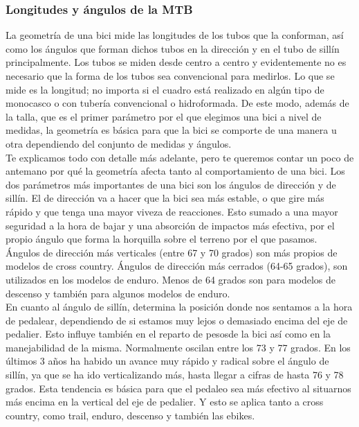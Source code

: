 \documentclass{article}
\begin{document}
\subsubsection{Longitudes y ángulos de la MTB}
La geometría de una bici mide las longitudes de los tubos que la conforman, así como los ángulos que forman dichos tubos en la dirección y en el tubo de sillín principalmente. Los tubos se miden desde centro a centro y evidentemente no es necesario que la forma de los tubos sea convencional para medirlos. Lo que se mide es la longitud; no importa si el cuadro está realizado en algún tipo de monocasco o con tubería convencional o hidroformada. De este modo, además de la talla, que es el primer parámetro por el que elegimos una bici a nivel de medidas, la geometría es básica para que la bici se comporte de una manera u otra dependiendo del conjunto de medidas y ángulos.\\
Te explicamos todo con detalle más adelante, pero te queremos contar un poco de antemano por qué la geometría afecta tanto al comportamiento de una bici. Los dos parámetros más importantes de una bici son los ángulos de dirección y de sillín. El de dirección va a hacer que la bici sea más estable, o que gire más rápido y que tenga una mayor viveza de reacciones. Esto sumado a una mayor seguridad a la hora de bajar y una absorción de impactos más efectiva, por el propio ángulo que forma la horquilla sobre el terreno por el que pasamos. Ángulos de dirección más verticales (entre 67 y 70 grados) son más propios de modelos de cross country. Ángulos de dirección más cerrados (64-65 grados), son utilizados en los modelos de enduro. Menos de 64 grados son para modelos de descenso y también para algunos modelos de enduro.\\
En cuanto al ángulo de sillín, determina la posición donde nos sentamos a la hora de pedalear, dependiendo de si estamos muy lejos o demasiado encima del eje de pedalier. Esto influye también en el reparto de pesosde la bici así como en la manejabilidad de la misma. Normalmente oscilan entre los 73 y 77 grados. En los últimos 3 años ha habido un avance muy rápido y radical sobre el ángulo de sillín, ya que se ha ido verticalizando más, hasta llegar a cifras de hasta 76 y 78 grados. Esta tendencia es básica para que el pedaleo sea más efectivo al situarnos más encima en la vertical del eje de pedalier. Y esto se aplica tanto a cross country, como trail, enduro, descenso y también las ebikes.
\end{document}
